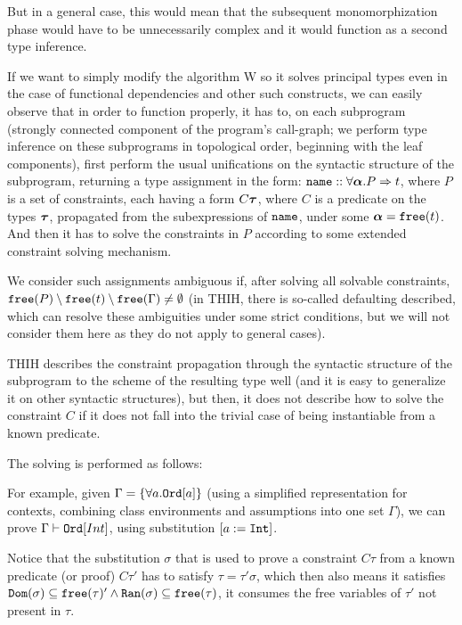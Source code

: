 But in a general case, this would mean that the subsequent monomorphization phase would have to be unnecessarily complex and it would function as a second type inference.

If we want to simply modify the algorithm W so it solves principal types even in the case of functional dependencies and other such constructs, we can easily observe that in order to function properly, it has to, on each subprogram (strongly connected component of the program's call-graph; we perform type inference on these subprograms in topological order, beginning with the leaf components), first perform the usual unifications on the syntactic structure of the subprogram, returning a type assignment in the form: $\mathtt{name} :: \forall \boldsymbol{\alpha} . P  \Rightarrow t$, where $P$ is a set of constraints, each having a form $C \boldsymbol{\tau}$, where $C$ is a predicate on the types $\boldsymbol{\tau}$, propagated from the subexpressions of $\mathtt{name}$, under some $\boldsymbol{\alpha} = \mathtt{free} (t)$. And then it has to solve the constraints in $P$ according to some extended constraint solving mechanism.

We consider such assignments ambiguous if, after solving all solvable constraints, $\mathtt{free} (P) \setminus \mathtt{free} (t) \setminus \mathtt{free} (\Gamma) \neq \emptyset$ (in THIH, there is so-called defaulting described, which can resolve these ambiguities under some strict conditions, but we will not consider them here as they do not apply to general cases).

THIH describes the constraint propagation through the syntactic structure of the subprogram to the scheme of the resulting type well (and it is easy to generalize it on other syntactic structures), but then, it does not describe how to solve the constraint $C$ if it does not fall into the trivial case of being instantiable from a known predicate.

The solving is performed as follows:

\begin{ex}
    For example, given $\Gamma = \{\forall a . \mathtt{Ord} [a]\}$ (using a simplified representation for contexts, combining class environments and assumptions into one set $\Gamma$), we can prove $\Gamma \vdash \mathtt{Ord} [Int]$, using substitution $[a := \mathtt{Int}]$.
\end{ex}

\begin{observe}
    Notice that the substitution $\sigma$ that is used to prove a constraint $C \tau$ from a known predicate (or proof) $C \tau'$ has to satisfy $\tau = \tau' \sigma$, which then also means it satisfies $\mathtt{Dom} (\sigma) \subseteq \mathtt{free} (\tau)' \land \mathtt{Ran} (\sigma) \subseteq \mathtt{free} (\tau)$, it consumes the free variables of $\tau'$ not present in $\tau$.
\end{observe}

